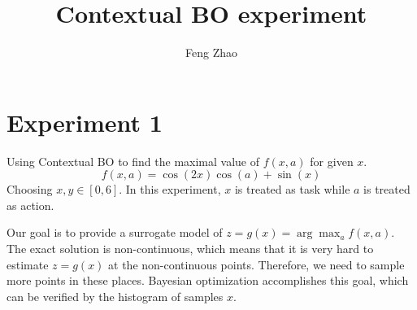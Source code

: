 \documentclass{article}
\title{Contextual BO experiment}
\author{Feng Zhao}
\begin{document}
\maketitle
\section{Experiment 1}
Using Contextual BO to find the maximal value of $f(x,a)$ for given $x$.
\begin{equation}\label{eq:f}
    f(x,a) = \cos(2 x) \cos(a) + \sin(x)
\end{equation}
Choosing $x,y \in [0,6]$.
In this experiment, $x$ is treated as task while $a$ is treated
as action.

Our goal is to provide a surrogate model of $z=g(x)=\arg\max_{a} f(x,a)$.
The exact solution is non-continuous, which means that it is very hard to estimate $z=g(x)$ at the
non-continuous points. Therefore, we need to sample more points in these places.
Bayesian optimization accomplishes this goal,
which can be verified by the histogram of samples $x$.
\end{document}
